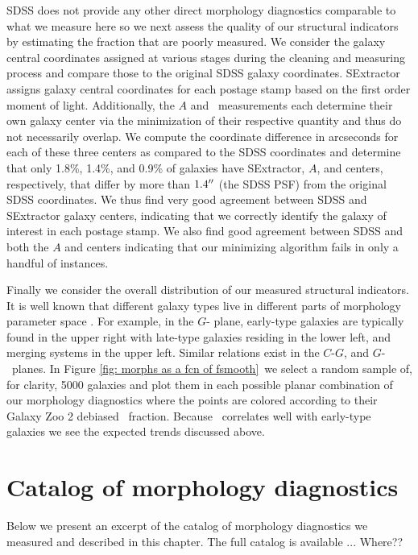 SDSS does not provide any other direct morphology diagnostics comparable to what we measure here so we next assess the quality of our structural indicators by estimating the fraction that are poorly measured. We consider the galaxy central coordinates assigned at various stages during the cleaning and measuring process and compare those to the original SDSS galaxy coordinates. SExtractor assigns galaxy central coordinates for each postage stamp based on the first order moment of light. Additionally, the $A$ and ~measurements each determine their own galaxy center via the minimization of their respective quantity and thus do not necessarily overlap. We compute the coordinate difference in arcseconds for each of these three centers as compared to the SDSS coordinates and determine that only 1.8\%, 1.4\%, and 0.9\% of galaxies have SExtractor, $A$, and  centers, respectively, that differ by more than $1.4\mbox{$^{\prime\prime}$}$ (the SDSS PSF) from the original SDSS coordinates. We thus find very good agreement between SDSS and SExtractor galaxy centers, indicating that we correctly identify the galaxy of interest in each postage stamp. We also find good agreement between SDSS and both the $A$ and  centers indicating that our minimizing algorithm fails in only a handful of instances.  


Finally we consider the overall distribution of our measured structural indicators. It is well known that different galaxy types live in different parts of morphology parameter space \citep{Abraham1996,Abraham2003,Conselice2000,Lotz2004,Lotz2008}. For example, in the $G$- plane, early-type galaxies are typically found in the upper right with late-type galaxies residing in the lower left, and merging systems in the upper left. Similar relations exist in the $C$-$G$, and $G$-~planes. In Figure \ref{fig: morphs as a fcn of fsmooth}~we select a random sample of, for clarity, 5000 galaxies and plot them in each possible planar combination of our morphology diagnostics where the points are colored according to their Galaxy Zoo 2 debiased \fsmooth~fraction. Because \fsmooth~correlates well with early-type galaxies we see the expected trends discussed above. 



\section{Catalog of morphology diagnostics}
Below we present an excerpt of the catalog of morphology diagnostics we measured and described in this chapter. The full catalog is available ... Where??

